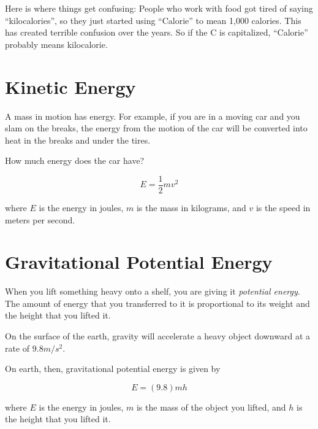 Here is where things get confusing: People who work with food got tired of
saying ``kilocalories'', so they just started using ``Calorie'' to
mean 1,000 calories.  This has created terrible confusion over the
years. So if the C is capitalized, ``Calorie'' probably means kilocalorie.

\section{Kinetic Energy}

A mass in motion has energy. For example, if you are in a moving car
and you slam on the breaks, the energy from the motion of the
car will be converted into heat in the breaks and under the tires.

How much energy does the car have?

\begin{mdframed}[style=important, frametitle={Formula for Kinetic Energy}]

$$E = \frac{1}{2} m v^2$$

where $E$ is the energy in joules, $m$ is the mass in kilograms, and
$v$ is the speed in meters per second.

\end{mdframed}

\section{Gravitational Potential Energy}

When you lift something heavy onto a shelf, you are giving it
\textit{potential energy}. The amount of energy that you transferred
to it is proportional to its weight and the height that you lifted it.

On the surface of the earth, gravity will accelerate a heavy object downward at
a rate of $9.8 m/s^2$.

\begin{mdframed}[style=important, frametitle={Formula for Gravitational Potential Energy}]
On earth, then, gravitational potential energy is given by

$$E = (9.8)mh$$


where $E$ is the energy in joules, $m$ is the mass of the object you
lifted, and $h$ is the height that you lifted it.

\end{mdframed}


